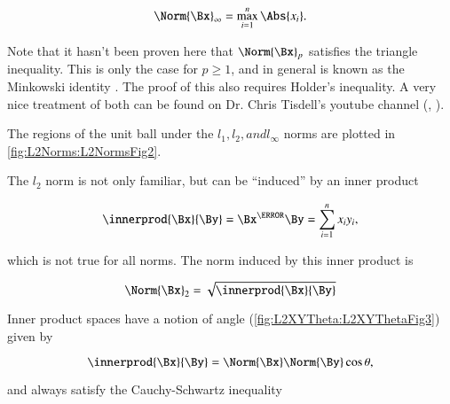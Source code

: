 \begin{equation}\label{eqn:convex-optimizationLecture2:324}
\Norm{\Bx}_\infty = \max_{i = 1}^n \Abs{x_i}.
\end{equation}

Note that it hasn't been proven here that \( \Norm{\Bx}_p \) satisfies the triangle inequality.  This is only the case for \( p \ge 1 \), and in general is known as the Minkowski identity \citep{triangleInequalityMathSE}.  The proof of this also requires Holder's inequality.  A very nice treatment of both can be found on Dr. Chris Tisdell's youtube channel (\citep{tisdellMinkowski}, \citep{tisdellHolder}).


The regions of the unit ball under the \( l_1, l_2, and l_\infty \) norms are plotted in \cref{fig:L2Norms:L2NormsFig2}.


The \( l_2 \) norm is not only familiar, but can be ``induced'' by an inner product

\begin{equation}\label{eqn:convex-optimizationLecture2:84}
\innerprod{\Bx}{\By} = \Bx^\T \By = \sum_{i = 1}^n x_i y_i,
\end{equation}

which is not true for all norms.  The norm induced by this inner product is

\begin{equation}\label{eqn:convex-optimizationLecture2:104}
\Norm{\Bx}_2 = \sqrt{ \innerprod{\Bx}{\By} }
\end{equation}

Inner product spaces have a notion of angle
(\cref{fig:L2XYTheta:L2XYThetaFig3})
given by

\begin{equation}\label{eqn:convex-optimizationLecture2:124}
\innerprod{\Bx}{\By} = \Norm{\Bx} \Norm{\By} \cos \theta,
\end{equation}

and always satisfy the Cauchy-Schwartz inequality

